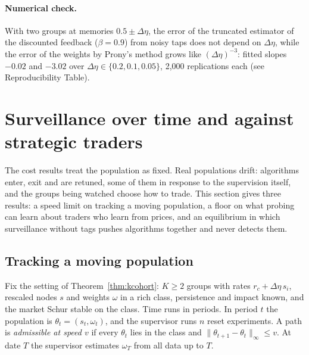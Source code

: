 \documentclass[12pt]{article}
\theoremstyle{definition}
\theoremstyle{remark}
\begin{document}
\paragraph{Numerical check.} With two groups at memories $0.5\pm\Delta\eta$, the error of the truncated estimator of the discounted feedback ($\beta=0.9$) from noisy taps does not depend on $\Delta\eta$, while the error of the weights by Prony's method grows like $(\Delta\eta)^{-3}$: fitted slopes $-0.02$ and $-3.02$ over $\Delta\eta\in\{0.2,0.1,0.05\}$, 2,000 replications each (see Reproducibility Table).

\section{Surveillance over time and against strategic traders}\label{app:dynamic}

The cost results treat the population as fixed. Real populations drift: algorithms enter, exit and are retuned, some of them in response to the supervision itself, and the groups being watched choose how to trade. This section gives three results: a speed limit on tracking a moving population, a floor on what probing can learn about traders who learn from prices, and an equilibrium in which surveillance without tags pushes algorithms together and never detects them.

\subsection{Tracking a moving population}

Fix the setting of Theorem~\ref{thm:kcohort}: $K\ge2$ groups with rates $r_c+\Delta\eta\,s_i$, rescaled nodes $s$ and weights $\omega$ in a rich class, persistence and impact known, and the market Schur stable on the class. Time runs in periods. In period $t$ the population is $\theta_t=(s_t,\omega_t)$, and the supervisor runs $n$ reset experiments. A path is \emph{admissible at speed $v$} if every $\theta_t$ lies in the class and $\|\theta_{t+1}-\theta_t\|_\infty\le v$. At date $T$ the supervisor estimates $\omega_T$ from all data up to $T$.
\end{document}

